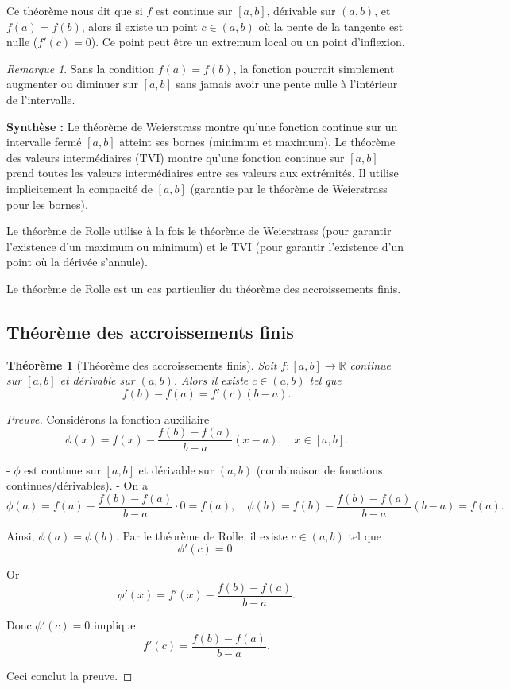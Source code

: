 \documentclass{report} %
\theoremstyle{definition}  %
\theoremstyle{plain} %
\newtheorem{theorem}{Théorème}[chapter]
\theoremstyle{remark} %
\newtheorem*{remark}{Remarque} %
\begin{document}
\medskip

Ce théorème nous dit que si \(f\) est continue sur \([a,b]\), dérivable sur \((a,b)\), et \(f(a) = f(b)\), 
alors il existe un point \(c \in (a,b)\) où la pente de la tangente est nulle (\(f'(c) = 0\)).  
Ce point peut être un extremum local ou un point d'inflexion.
\begin{remark}
Sans la condition \(f(a) = f(b)\), la fonction pourrait simplement augmenter ou diminuer sur \([a,b]\) sans jamais avoir une pente nulle à l'intérieur de l'intervalle.
\end{remark}

\medskip

\noindent
\textbf{Synthèse :}
Le théorème de Weierstrass montre qu'une fonction continue sur un intervalle fermé \([a,b]\) atteint ses bornes (minimum et maximum).
Le théorème des valeurs intermédiaires (TVI) montre qu'une fonction continue sur \([a,b]\) 
prend toutes les valeurs intermédiaires entre ses valeurs aux extrémités. Il utilise implicitement 
la compacité de \([a,b]\) (garantie par le théorème de Weierstrass pour les bornes).

\noindent
Le théorème de Rolle utilise à la fois le théorème de Weierstrass (pour garantir l'existence d'un maximum ou minimum) 
et le TVI (pour garantir l'existence d'un point où la dérivée s'annule).

\medskip

\noindent
Le théorème de Rolle est un cas particulier du théorème des accroissements finis.

\medskip

\subsection{Théorème des accroissements finis}

\begin{theorem}[Théorème des accroissements finis]
Soit \(f : [a,b] \to \mathbb{R}\) continue sur \([a,b]\) et dérivable sur \((a,b)\).  
Alors il existe \(c \in (a,b)\) tel que
\[
f(b)-f(a) = f'(c)(b-a).
\]
\end{theorem}

\begin{proof}[Preuve]
Considérons la fonction auxiliaire
\[
\phi(x) = f(x) - \frac{f(b)-f(a)}{b-a}(x-a), \quad x \in [a,b].
\]

- $\phi$ est continue sur $[a,b]$ et dérivable sur $(a,b)$ (combinaison de fonctions continues/dérivables).
- On a
\[
\phi(a) = f(a) - \frac{f(b)-f(a)}{b-a} \cdot 0 = f(a), \quad
\phi(b) = f(b) - \frac{f(b)-f(a)}{b-a}(b-a) = f(a).
\]

Ainsi, $\phi(a) = \phi(b)$. Par le théorème de Rolle, il existe $c \in (a,b)$ tel que
\[
\phi'(c) = 0.
\]

Or
\[
\phi'(x) = f'(x) - \frac{f(b)-f(a)}{b-a}.
\]

Donc $\phi'(c) = 0$ implique
\[
f'(c) = \frac{f(b)-f(a)}{b-a}.
\]

Ceci conclut la preuve.
\end{proof}
\end{document}
